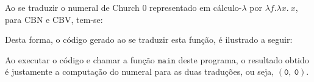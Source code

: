 Ao se traduzir o numeral de Church 0 representado em cálculo-$\lambda$ por $\lambda f.\lambda x.\ x$, para CBN e CBV, tem-se:


Desta forma, o código gerado ao se traduzir esta função, é ilustrado a seguir:

Ao executar o código e chamar a função $\mathtt{main}$ deste programa, o resultado obtido é justamente a computação do numeral para as duas traduções, ou seja, $\mathtt{(0,\ 0)}$.
